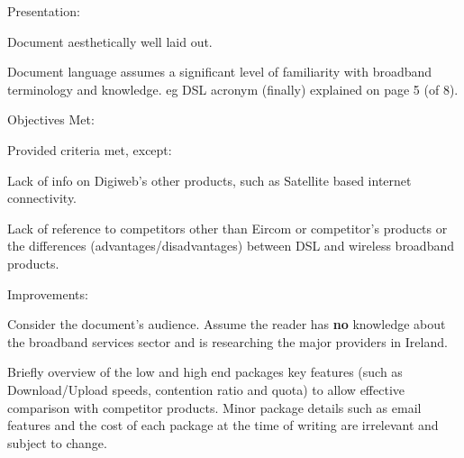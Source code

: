 \documentclass[landscape,semcolor,a4]{seminar}
\newenvironment{stitle}{\LARGE\color{conallblue}}{}
\begin{document}
\sffamily
\pagecolor{darkblue}
\color{white}

\begin{slide}

\begin{stitle}
Presentation:
\end{stitle}

\vspace{15mm}

Document aesthetically well laid out. \\

\vspace{5mm}

Document language assumes a significant level of familiarity with broadband 
terminology and knowledge. eg DSL acronym (finally) explained on page 5 (of 8).

\end{slide}

\begin{slide}

\begin{stitle}
Objectives Met:
\end{stitle}

\vspace{15mm}

Provided criteria met, except:

\vspace{5mm}

Lack of info on Digiweb's other products, such as Satellite based
internet connectivity. \\

\vspace{5mm}

Lack of reference to competitors other than Eircom or competitor's
products or the differences (advantages/disadvantages) between DSL and
wireless broadband products. 

\end{slide}

\begin{slide}

\begin{stitle}
Improvements:
\end{stitle}

\vspace{15mm}

Consider the document's audience. Assume the reader has \textbf{no} knowledge 
about the broadband services sector and is researching the major
providers in Ireland. \\

\vspace{5mm}

Briefly overview of the low and high end packages key features
(such as Download/Upload speeds, contention ratio and quota) to allow
effective comparison with competitor products. Minor package details 
such as email features and the cost of each package at the time of 
writing are irrelevant and subject to change.

\end{slide}
\end{document}
